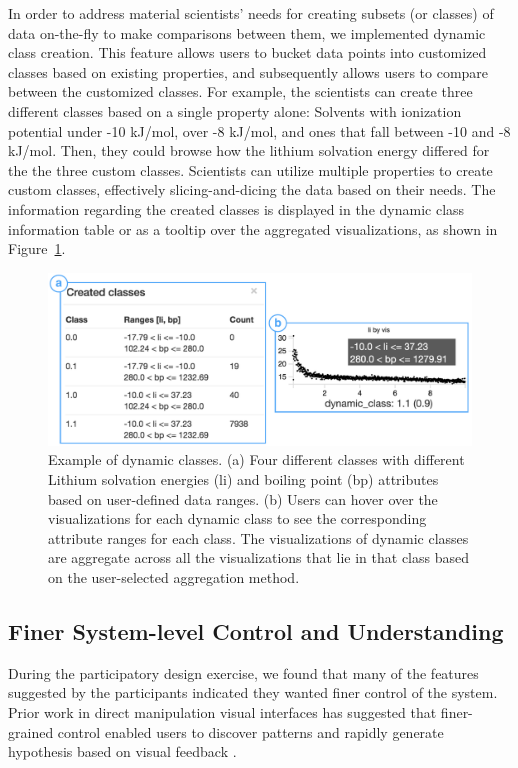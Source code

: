  In order to address material scientists' needs for creating subsets (or classes) of data on-the-fly to make comparisons between them, we implemented dynamic class creation. This feature allows users to bucket data points into customized classes based on existing properties, and subsequently allows users to compare between the customized classes. For example, the scientists can create three different classes based on a single property alone: Solvents with ionization potential under -10 kJ/mol, over -8 kJ/mol, and ones that fall between -10 and -8 kJ/mol. Then, they could browse how the lithium solvation energy differed for the the three custom classes. 
\npar Scientists can utilize multiple properties to create custom classes, effectively slicing-and-dicing the data based on their needs. The information regarding the created classes is displayed in the dynamic class information table or as a tooltip over the aggregated visualizations, as shown in Figure~\ref{dcc}.
\begin{figure}[h!]
\centering
\includegraphics[width=\linewidth]{figures/dcc_example.pdf}
\vspace{-6pt}
\caption{Example of dynamic classes. (a) Four different classes with different Lithium solvation energies (li) and boiling point (bp) attributes based on user-defined data ranges. (b) Users can hover over the visualizations for each dynamic class to see the corresponding attribute ranges for each class. The visualizations of dynamic classes are aggregate across all the visualizations that lie in that class based on the user-selected aggregation method.}
\label{dcc}
\vspace{-10pt}
\end{figure}
\subsection{Finer System-level Control and  Understanding}
\par During the participatory design exercise, we found that many of the features suggested by the participants indicated they wanted finer control of the system. Prior work in direct manipulation visual interfaces has suggested that finer-grained control enabled users to discover patterns and rapidly generate hypothesis based on visual feedback \cite{Shneiderman1994,Shneiderman2007a}. 

